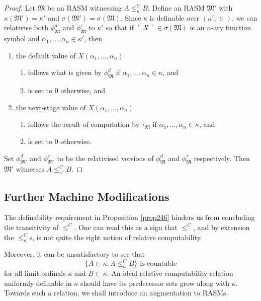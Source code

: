 \documentclass[12pt, twoside]{memoir}
\numberwithin{equation}{section}
\theoremstyle{definition}
\theoremstyle{remark}
\theoremstyle{definition}
\theoremstyle{definition}
\theoremstyle{definition}
\theoremstyle{remark}
\begin{document}
\begin{proof}
Let $\mathfrak{M}$ be an RASM witnessing $A \leq^C_{\kappa} B$. Define an RASM $\mathfrak{M}'$ with $\kappa(\mathfrak{M}') = \kappa'$ and $\sigma(\mathfrak{M}') = \sigma(\mathfrak{M})$. Since $\kappa$ is definable over $(\kappa'; \in)$, we can relativise both $\phi^d_{\mathfrak{M}}$ and $\phi^{\tau}_{\mathfrak{M}}$ to $\kappa'$ so that if $\ulcorner X \urcorner \in \sigma(\mathfrak{M})$ is an $n$-ary function symbol and $\alpha_1, \dots, \alpha_n \in \kappa'$, then 
\begin{enumerate}[label=(\arabic*)]
    \item the default value of $X(\alpha_1, \dots, \alpha_n)$
    \begin{enumerate}[label=(\alph*)]
        \item follows what is given by $\phi^d_{\mathfrak{M}}$ if $\alpha_1, \dots, \alpha_n \in \kappa$, and
        \item is set to $0$ otherwise, and
    \end{enumerate}
    \item the next-stage value of $X(\alpha_1, \dots, \alpha_n)$
    \begin{enumerate}[label=(\alph*)]
        \item follows the result of computation by $\tau_{\mathfrak{M}}$ if $\alpha_1, \dots, \alpha_n \in \kappa$, and
        \item is set to $0$ otherwise.
    \end{enumerate}
\end{enumerate} 
Set $\phi^d_{\mathfrak{M}'}$ and $\phi^{\tau}_{\mathfrak{M}'}$ to be the relativised versions of $\phi^d_{\mathfrak{M}}$ and $\phi^{\tau}_{\mathfrak{M}}$ respectively. Then $\mathfrak{M}'$ witnesses $A \leq^C_{\kappa'} B$.
\end{proof}

\subsection{Further Machine Modifications}

The definability requirement in Proposition \ref{prop246} hinders us from concluding the transitivity of $\leq^C$. One can read this as a sign that $\leq^C$, and by extension the $\leq^C_{\kappa}$s, is not quite the right notion of relative computability.

Moreover, it can be unsatisfactory to see that
\begin{equation*}
    \{A \subset \kappa : A \leq^C_{\kappa} B\} \text{ is countable}
\end{equation*}
for all limit ordinals $\kappa$ and $B \subset \kappa$. An ideal relative computability relation uniformly definable in $\kappa$ should have its predecessor sets grow along with $\kappa$. Towards such a relation, we shall introduce an augmentation to RASMs.
\end{document}
